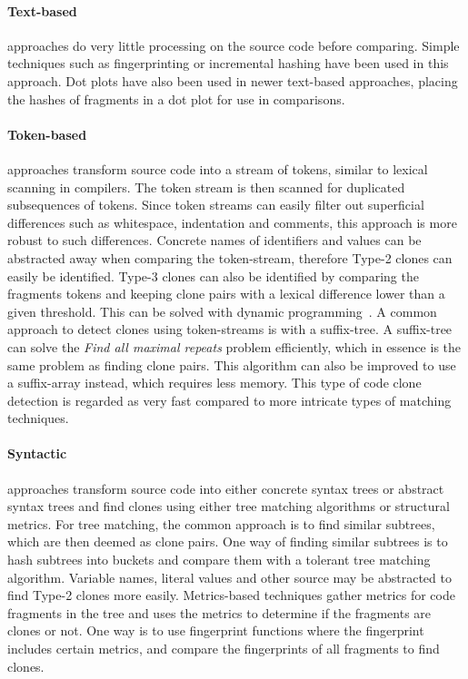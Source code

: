 \paragraph{Text-based} approaches do very little processing on the source code before
comparing. Simple techniques such as fingerprinting or incremental hashing have been used
in this approach. Dot plots have also been used in newer text-based approaches, placing
the hashes of fragments in a dot plot for use in comparisons.

\paragraph{Token-based} approaches transform source code into a stream of tokens, similar
to lexical scanning in compilers. The token stream is then scanned for duplicated
subsequences of tokens. Since token streams can easily filter out superficial differences
such as whitespace, indentation and comments, this approach is more robust to such
differences. Concrete names of identifiers and values can be abstracted away when
comparing the token-stream, therefore Type-2 clones can easily be identified. Type-3
clones can also be identified by comparing the fragments tokens and keeping clone pairs
with a lexical difference lower than a given threshold. This can be solved with dynamic
programming~\cite{BakerSparseDynamicProgramming}. A common approach to detect clones using
token-streams is with a suffix-tree. A suffix-tree can solve the \textit{Find all maximal
repeats} problem efficiently, which in essence is the same problem as finding clone pairs.
This algorithm can also be improved to use a suffix-array instead, which requires less
memory. This type of code clone detection is regarded as very fast compared to more
intricate types of matching techniques.

\paragraph{Syntactic} approaches transform source code into either concrete syntax trees
or abstract syntax trees and find clones using either tree matching algorithms or
structural metrics. For tree matching, the common approach is to find similar subtrees,
which are then deemed as clone pairs. One way of finding similar subtrees is to hash
subtrees into buckets and compare them with a tolerant tree matching algorithm. Variable
names, literal values and other source may be abstracted to find Type-2 clones more
easily. Metrics-based techniques gather metrics for code fragments in the tree and uses
the metrics to determine if the fragments are clones or not. One way is to use
fingerprint functions where the fingerprint includes certain metrics, and compare the
fingerprints of all fragments to find clones.

